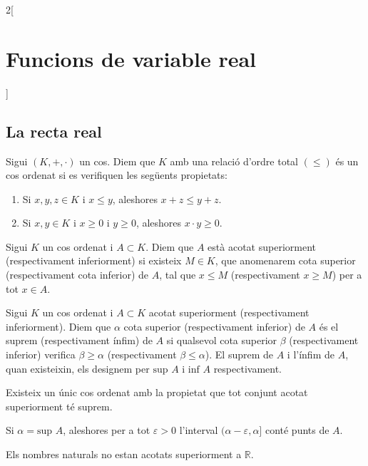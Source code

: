 \documentclass[../../../main.tex]{subfiles}
\begin{document}
\begin{multicols}{2}[\section{Funcions de variable real}]
\subsection{La recta real}
\begin{definition}
Sigui $(K,+,\cdot)$ un cos. Diem que $K$ amb una relació d'ordre total $(\leq)$ és un cos ordenat si es verifiquen les següents propietats:
\begin{enumerate}
    \item Si $x,y,z\in K$ i $x\leq y$, aleshores $x+z\leq y+z$.
    \item Si $x,y\in K$ i $x\geq0$ i $y\geq0$, aleshores $x\cdot y\geq 0$.
\end{enumerate}
\end{definition}
\begin{definition}
Sigui $K$ un cos ordenat i $A\subset K$. Diem que $A$ està acotat superiorment
(respectivament inferiorment) si existeix $M\in K$, que anomenarem cota superior (respectivament cota inferior) de $A$, tal que $x\leq M$ (respectivament $x\geq M$) per a tot $x\in A$.
\end{definition}
\begin{definition}
Sigui $K$ un cos ordenat i $A\subset K$ acotat superiorment (respectivament inferiorment). Diem que $\alpha$ cota superior (respectivament inferior) de $A$ és el suprem (respectivament ínfim) de $A$ si qualsevol cota superior $\beta$ (respectivament inferior) verifica $\beta\geq\alpha$ (respectivament $\beta\leq\alpha$). El suprem de $A$ i l'ínfim de $A$, quan existeixin, els designem per $\text{sup }A$ i $\text{inf }A$ respectivament.
\end{definition}
\begin{theorem}
Existeix un únic cos ordenat amb la propietat que tot conjunt acotat
superiorment té suprem.
\end{theorem}
\begin{lemma}
Si $\alpha=\text{sup }A$, aleshores per a tot $\varepsilon>0$ l'interval $(\alpha-\varepsilon,\alpha]$ conté punts de $A$.
\end{lemma}
\begin{prop}
Els nombres naturals no estan acotats superiorment a $\mathbb{R}$.
\end{prop}
\begin{prop}

\end{prop}
\end{multicols}
\end{document}

